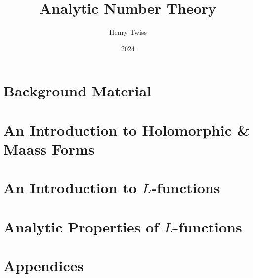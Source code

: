 \documentclass[12pt,oneside]{book}
\title{Analytic Number Theory}
\author{Henry Twiss}
\date{2024}
\begin{document}
\maketitle
\pagestyle{empty}
\tableofcontents
\setcounter{page}{0}
\pagestyle{fancy}

\part{Background Material}
  

\part{An Introduction to Holomorphic \& Maass Forms}
  
  
  
  

\part{An Introduction to \texorpdfstring{$L$}{L}-functions}
  
  

\part{Analytic Properties of \texorpdfstring{$L$}{L}-functions}
  
  
  
  


\part{Appendices}
  

\printindex


\end{document}
